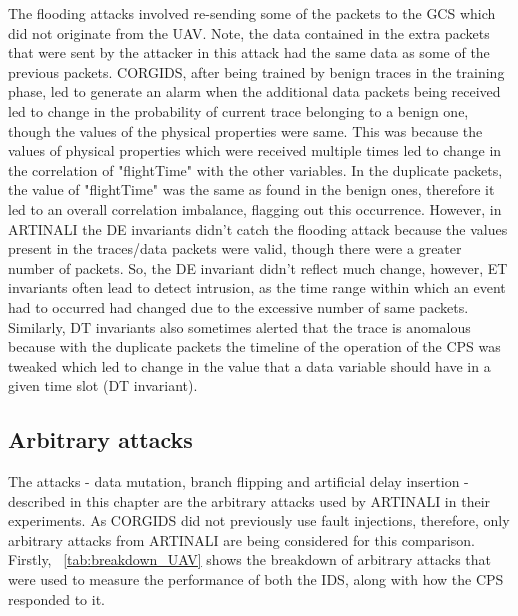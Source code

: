The flooding attacks involved re-sending some of the packets to the \ac{GCS} which did not originate from the \ac{UAV}. Note, the data contained in the extra packets that were sent by the attacker in this attack had the same data as some of the previous packets. \ac{CORGIDS}, after being trained by benign traces in the training phase, led to generate an alarm when the additional data packets being received led to change in the probability of current trace belonging to a benign one, though the values of the physical properties were same. This was because the values of physical properties which were received multiple times led to change in the correlation of "flightTime" with the other variables. In the duplicate packets, the value of "flightTime" was the same as found in the benign ones, therefore it led to an overall correlation imbalance, flagging out this occurrence. However, in ARTINALI the D\textbar E invariants didn't catch the flooding attack because the values present in the traces/data packets were valid, though there were a greater number of packets. So, the D\textbar E invariant didn't reflect much change, however, E\textbar T invariants often lead to detect intrusion, as the time range within which an event had to occurred had changed due to the excessive number of same packets. Similarly, D\textbar T invariants also sometimes alerted that the trace is anomalous because with the duplicate packets the timeline of the operation of the \ac{CPS} was tweaked which led to change in the value that a data variable should have in a given time slot (D\textbar T invariant).

\subsection{Arbitrary attacks}
The attacks - data mutation, branch flipping and artificial delay insertion - described in this chapter are the arbitrary attacks used by ARTINALI in their experiments. As \ac{CORGIDS} did not previously use fault injections, therefore, only arbitrary attacks from ARTINALI are being considered for this comparison.
Firstly, ~\autoref{tab:breakdown_UAV} shows the breakdown of arbitrary attacks that were used to measure the performance of both the \ac{IDS}, along with how the \ac{CPS} responded to it.

\begin{table}
\centering
  \caption{Breakdown of arbitrary attacks for \ac{UAV} platform}
  \label{tab:breakdown_UAV}
\end{table}

